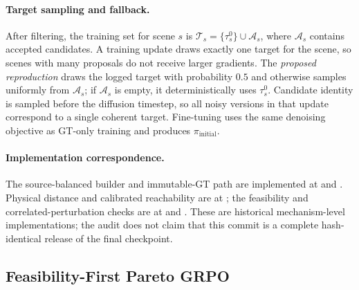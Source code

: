 \paragraph{Target sampling and fallback.}
After filtering, the training set for scene $s$ is
$\mathcal T_s=\{\tau_s^0\}\cup\mathcal A_s$, where $\mathcal A_s$ contains
accepted candidates.  A training update draws exactly one target for the
scene, so scenes with many proposals do not receive larger gradients.  The
\emph{proposed reproduction} draws the logged target with probability $0.5$
and otherwise samples uniformly from $\mathcal A_s$; if $\mathcal A_s$ is
empty, it deterministically uses $\tau_s^0$.  Candidate identity is sampled
before the diffusion timestep, so all noisy versions in that update correspond
to a single coherent target.  Fine-tuning uses the same denoising objective as
GT-only training and produces $\pi_{\mathrm{initial}}$.

\paragraph{Implementation correspondence.}
The source-balanced builder and immutable-GT path are implemented at
and .
Physical distance and calibrated reachability are at
;
the feasibility and correlated-perturbation checks are at
 and
.
These are historical mechanism-level implementations; the audit does not claim
that this commit is a complete hash-identical release of the final checkpoint.

\subsection{Feasibility-First Pareto GRPO}
\label{sec:ff-pgrpo-details}

